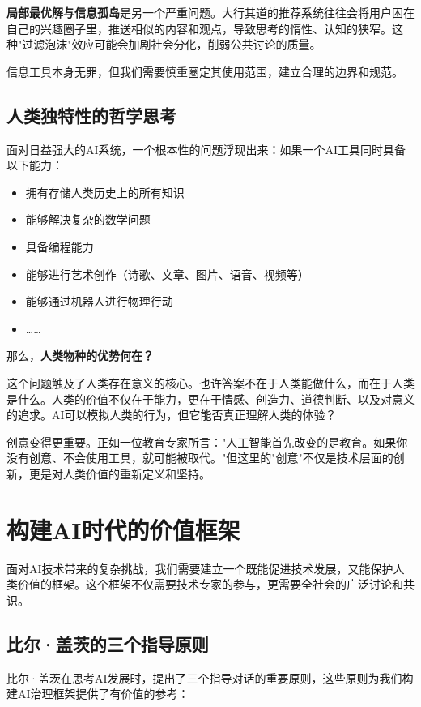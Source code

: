 {\bf 局部最优解与信息孤岛}是另一个严重问题。大行其道的推荐系统往往会将用户困在自己的兴趣圈子里，推送相似的内容和观点，导致思考的惰性、认知的狭窄。这种"过滤泡沫"效应可能会加剧社会分化，削弱公共讨论的质量。

信息工具本身无罪，但我们需要慎重圈定其使用范围，建立合理的边界和规范。

\subsection{人类独特性的哲学思考}

面对日益强大的AI系统，一个根本性的问题浮现出来：如果一个AI工具同时具备以下能力：

\begin{itemize}
\item 拥有存储人类历史上的所有知识
\item 能够解决复杂的数学问题
\item 具备编程能力
\item 能够进行艺术创作（诗歌、文章、图片、语音、视频等）
\item 能够通过机器人进行物理行动
\item ……
\end{itemize}

那么，{\bf 人类物种的优势何在？}

这个问题触及了人类存在意义的核心。也许答案不在于人类能做什么，而在于人类是什么。人类的价值不仅在于能力，更在于情感、创造力、道德判断、以及对意义的追求。AI可以模拟人类的行为，但它能否真正理解人类的体验？

创意变得更重要。正如一位教育专家所言："人工智能首先改变的是教育。如果你没有创意、不会使用工具，就可能被取代。"但这里的"创意"不仅是技术层面的创新，更是对人类价值的重新定义和坚持。

\section{构建AI时代的价值框架}

面对AI技术带来的复杂挑战，我们需要建立一个既能促进技术发展，又能保护人类价值的框架。这个框架不仅需要技术专家的参与，更需要全社会的广泛讨论和共识。

\subsection{比尔·盖茨的三个指导原则}

比尔·盖茨在思考AI发展时，提出了三个指导对话的重要原则，这些原则为我们构建AI治理框架提供了有价值的参考：

